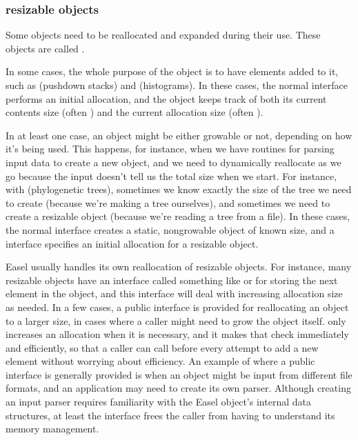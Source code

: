   \subsubsection{resizable objects}

Some objects need to be reallocated and expanded during their use.
These objects are called .

In some cases, the whole purpose of the object is to have elements
added to it, such as  (pushdown stacks) and
 (histograms). In these cases, the normal
 interface performs an initial allocation, and the
object keeps track of both its current contents size (often
) and the current allocation size (often
). 

In at least one case, an object might be either growable or not,
depending on how it's being used. This happens, for instance, when we
have routines for parsing input data to create a new object, and we
need to dynamically reallocate as we go because the input doesn't tell
us the total size when we start. For instance, with 
(phylogenetic trees), sometimes we know exactly the size of the tree
we need to create (because we're making a tree ourselves), and
sometimes we need to create a resizable object (because we're reading a
tree from a file). In these cases, the normal 
interface creates a static, nongrowable object of known size, and a
 interface specifies an initial allocation
for a resizable object.

Easel usually handles its own reallocation of resizable objects. For
instance, many resizable objects have an interface called something
like  or  for storing the next element
in the object, and this interface will deal with increasing allocation
size as needed.  In a few cases, a public  interface
is provided for reallocating an object to a larger size, in cases
where a caller might need to grow the object itself. 
only increases an allocation when it is necessary, and it makes that
check immediately and efficiently, so that a caller can call
 before every attempt to add a new element without
worrying about efficiency. An example of where a public
 interface is generally provided is when an object
might be input from different file formats, and an application may
need to create its own parser. Although creating an input parser
requires familiarity with the Easel object's internal data structures,
at least the  interface frees the caller from having
to understand its memory management.

